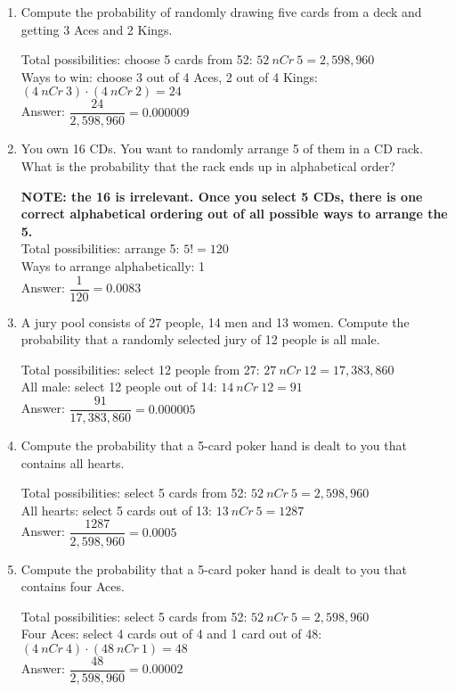 \begin{enumerate}
\item Compute the probability of randomly drawing five cards from a deck and getting 3 Aces and 2 Kings. 
\begin{center}
Total possibilities: choose 5 cards from 52: $52\ nCr\ 5 = 2,598,960$\\
Ways to win: choose 3 out of 4 Aces, 2 out of 4 Kings: $(4\ nCr\ 3) \cdot (4\ nCr\ 2) = 24$\\
Answer: $\dfrac{24}{2,598,960} = 0.000009$
\end{center}

\item You own 16 CDs. You want to randomly arrange 5 of them in a CD rack. What is the probability that the rack ends up in alphabetical order? 
\begin{center}
\textbf{NOTE: the 16 is irrelevant.  Once you select 5 CDs, there is one correct alphabetical ordering out of all possible ways to arrange the 5.}\\
Total possibilities: arrange 5: $5! = 120$\\
Ways to arrange alphabetically: 1\\
Answer: $\dfrac{1}{120} = 0.0083$
\end{center}

\item A jury pool consists of 27 people, 14 men and 13 women. Compute the probability that a randomly selected jury of 12 people is all male. 
\begin{center}
Total possibilities: select 12 people from 27: $27\ nCr\ 12 = 17,383,860$\\
All male: select 12 people out of 14: $14\ nCr\ 12 = 91$\\
Answer: $\dfrac{91}{17,383,860} = 0.000005$
\end{center}

\item Compute the probability that a 5-card poker hand is dealt to you that contains all hearts. 
\begin{center}
Total possibilities: select 5 cards from 52: $52\ nCr\ 5 = 2,598,960$\\
All hearts: select 5 cards out of 13: $13\ nCr\ 5 = 1287$\\
Answer: $\dfrac{1287}{2,598,960} = 0.0005$
\end{center}

\item Compute the probability that a 5-card poker hand is dealt to you that contains four Aces. 
\begin{center}
Total possibilities: select 5 cards from 52: $52\ nCr\ 5 = 2,598,960$\\
Four Aces: select 4 cards out of 4 and 1 card out of 48: $(4\ nCr\ 4) \cdot (48\ nCr\ 1) = 48$\\
Answer: $\dfrac{48}{2,598,960} = 0.00002$
\end{center}


\end{enumerate}
